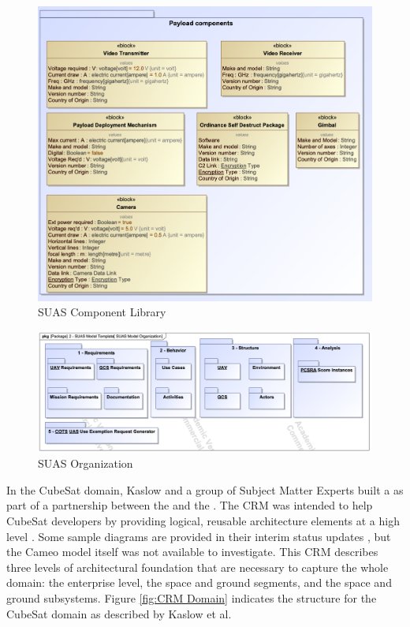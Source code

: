 \begin{figure}[H]
    \centering
    \includegraphics[width=\textwidth]{Thesis/Literature_Review/Lit Review Figures/suas component library.png}
    \caption{SUAS Component Library}
    \label{fig:SUAS Component Library}
\end{figure}

\begin{figure}[H]
    \centering
    \includegraphics[width=\textwidth]{Thesis/Literature_Review/Lit Review Figures/suas organization.png}
    \caption{SUAS Organization}
    \label{fig:SUAS Organization}
\end{figure}

In the CubeSat domain, Kaslow and a group of Subject Matter Experts built a  as part of a partnership between the  and the . The CRM was intended to help CubeSat developers by providing logical, reusable architecture elements at a high level \citep{Kaslow2016}. Some sample diagrams are provided in their interim status updates \citep{Kaslow2016,Kaslow2017,CRM20,Kaslow2014,Kaslow2020,KaslowCRM3}, but the Cameo model itself was not available to investigate. This CRM describes three levels of architectural foundation that are necessary to capture the whole domain: the enterprise level, the space and ground segments, and the space and ground subsystems. Figure \ref{fig:CRM Domain} indicates the structure for the CubeSat domain as described by Kaslow et al.

